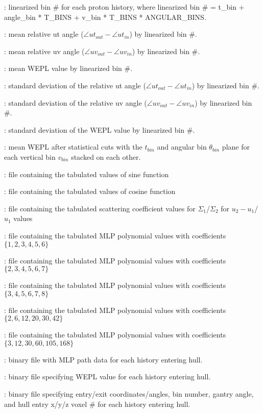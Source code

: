 \item {} : linearized bin \# for each proton history, where linearized bin \# = t\_bin + angle\_bin * T\_BINS + v\_bin * T\_BINS * ANGULAR\_BINS.
\item { : mean relative ut angle ($\angle ut_{out} -\angle ut_{in}$) by linearized bin \#.}
\item {} : mean relative uv angle ($\angle uv_{out} -\angle uv_{in}$) by linearized bin \#.
\item {} : mean WEPL value by linearized bin \#.
\item {} : standard deviation of the relative ut angle ($\angle ut_{out} -\angle ut_{in}$) by linearized bin \#.
\item {} : standard deviation of the relative uv angle ($\angle uv_{out} -\angle uv_{in}$) by linearized bin \#.
\item {} : standard deviation of the WEPL value by linearized bin \#.
\item {} : mean WEPL after statistical cuts with the $t_{bin}$ and angular bin $\theta_{bin}$ plane for each vertical bin $v_{bin}$ stacked on each other.
\item {} : file containing the tabulated values of sine function
\item {} : file containing the tabulated values of cosine function
\item {} : file containing the tabulated scattering coefficient values for $\Sigma_1$/$\Sigma_2$ for $u_2-u_1$/$u_1$ values
\item {} : file containing the tabulated MLP polynomial values with coefficients $\{1,2,3,4,5,6\}$
\item {} : file containing the tabulated MLP polynomial values with coefficients $\{2,3,4,5,6,7\}$
\item {} : file containing the tabulated MLP polynomial values with coefficients $\{3,4,5,6,7,8\}$
\item {} : file containing the tabulated MLP polynomial values with coefficients $\{2,6,12,20,30,42\}$
\item {} : file containing the tabulated MLP polynomial values with coefficients $\{3,12,30,60,105,168\}$
\item {} : binary file with MLP path data for each history entering hull.
\item {} : binary file specifying WEPL value for each history entering hull.
\item {} : binary file specifying entry/exit coordinates/angles, bin number, gantry angle, and hull entry x/y/z voxel \# for each history entering hull.
